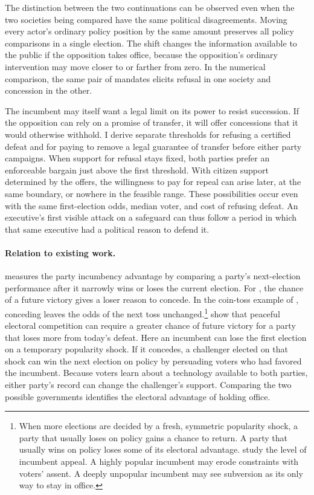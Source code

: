 \documentclass[11pt,letterpaper]{article}
\begin{document}
The distinction between the two continuations can be observed even when the two societies being compared have the same political disagreements. Moving every actor's ordinary policy position by the same amount preserves all policy comparisons in a single election. The shift changes the information available to the public if the opposition takes office, because the opposition's ordinary intervention may move closer to or farther from zero. In the numerical comparison, the same pair of mandates elicits refusal in one society and concession in the other.

The incumbent may itself want a legal limit on its power to resist succession. If the opposition can rely on a promise of transfer, it will offer concessions that it would otherwise withhold. I derive separate thresholds for refusing a certified defeat and for paying to remove a legal guarantee of transfer before either party campaigns. When support for refusal stays fixed, both parties prefer an enforceable bargain just above the first threshold. With citizen support determined by the offers, the willingness to pay for repeal can arise later, at the same boundary, or nowhere in the feasible range. These possibilities occur even with the same first-election odds, median voter, and cost of refusing defeat. An executive's first visible attack on a safeguard can thus follow a period in which that same executive had a political reason to defend it.

\paragraph{Relation to existing work.}
\citet{leeparty} measures the party incumbency advantage by comparing a party's next-election performance after it narrowly wins or loses the current election. For \citet{przeworski}, the chance of a future victory gives a loser reason to concede. In the coin-toss example of \citet{przeworskicoin}, conceding leaves the odds of the next toss unchanged.\footnote{When more elections are decided by a fresh, symmetric popularity shock, a party that usually loses on policy gains a chance to return. A party that usually wins on policy loses some of its electoral advantage. \citet{luoprzeworski} study the level of incumbent appeal. A highly popular incumbent may erode constraints with voters' assent. A deeply unpopular incumbent may see subversion as its only way to stay in office.} \citet*{przeworskiriveroxi} show that peaceful electoral competition can require a greater chance of future victory for a party that loses more from today's defeat. Here an incumbent can lose the first election on a temporary popularity shock. If it concedes, a challenger elected on that shock can win the next election on policy by persuading voters who had favored the incumbent. Because voters learn about a technology available to both parties, either party's record can change the challenger's support. Comparing the two possible governments identifies the electoral advantage of holding office.
\end{document}
